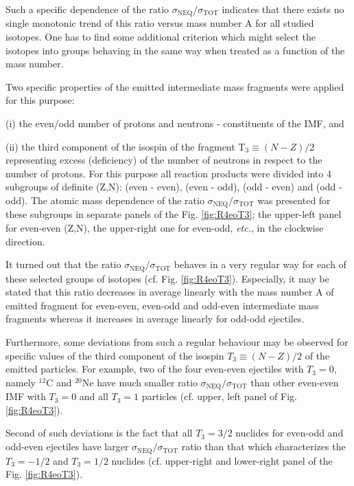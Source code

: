 Such a specific dependence of the ratio
$\sigma_{\text{NEQ}}/\sigma_{\text{TOT}}$ indicates that there
exists no single monotonic trend of this ratio versus mass number A
for all studied isotopes. One has to find some additional criterion
which might select the isotopes into groups behaving in the same way
when treated as a function of the mass number.

   Two specific properties of the emitted intermediate mass fragments were applied
for this purpose:

(i) the even/odd number of protons and neutrons - constituents of
the IMF, and

(ii) the third component of the isospin of the fragment T$_3 \equiv
(N-Z)/2$ representing excess (deficiency) of the number of neutrons
in respect to the number of protons. For this purpose all reaction
products were divided into 4 subgroups of definite (Z,N): (even -
even), (even - odd), (odd - even) and (odd - odd). The atomic mass
dependence of the ratio $\sigma_{\text{NEQ}}/\sigma_{\text{TOT}}$
was presented for these subgroups in separate panels of the Fig.
\ref{fig:R4eoT3}; the upper-left panel for even-even (Z,N), the
upper-right one for even-odd, \emph{etc.}, in the clockwise
direction.

It turned out that the ratio
$\sigma_{\text{NEQ}}/\sigma_{\text{TOT}}$ behaves in a very regular
way for each of these selected groups of isotopes (cf. Fig.
\ref{fig:R4eoT3}). Especially, it may be stated that this ratio
decreases in average linearly with the mass number A of emitted
fragment for even-even, even-odd and odd-even intermediate mass
fragments whereas it increases in average linearly for odd-odd
ejectiles.

Furthermore, some deviations from such a regular behaviour may be
observed for specific values of the third component of the isospin
$T_3 \equiv (N-Z)/2$ of the emitted particles. For example, two of
the four even-even ejectiles with $T_3=0$, namely $^{12}$C and
$^{20}$Ne have much smaller ratio
$\sigma_{\text{NEQ}}/\sigma_{\text{TOT}}$ than other even-even IMF
with $T_3=0$ and all $T_3=1$ particles %
(cf.
upper, left panel of Fig. \ref{fig:R4eoT3}).

 Second of such
deviations is the fact that all $T_3=3/2$ nuclides for even-odd and
odd-even ejectiles have larger
$\sigma_{\text{NEQ}}/\sigma_{\text{TOT}}$ ratio than that which
characterizes the $T_3=-1/2$ and $T_3=1/2$ nuclides (cf. upper-right
and lower-right panel of the Fig. \ref{fig:R4eoT3}).

